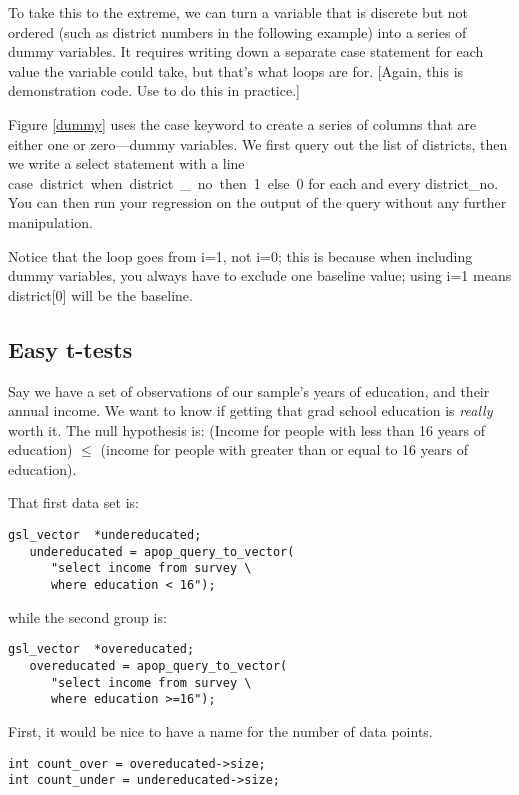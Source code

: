 To take this to the extreme, we can turn a variable that is discrete
but not ordered (such as district numbers in the following example)
into a series of dummy variables. It requires writing down a separate
\si{case} statement for each value the variable could take, but
that's what  loops are for.  [Again, this is demonstration
code. Use  to do this in practice.]


Figure \ref{dummy} uses the \si{case} keyword to create a series of
columns that are either one or zero---dummy variables.  We first query
out the list of districts, then we write a select statement with a line
\si{case district when district\_no then 1 else 0} for each and
every district\_no. You can then run your regression on the output of
the query without any further manipulation.

Notice that the  loop goes from i=1, not i=0; this is because when
including dummy variables, you always have to exclude one baseline
value; using i=1 means district[0] will be the baseline.

\subsection{Easy t-tests}
Say we have a set of observations of our sample's years of education,
and their annual income. We want to know if getting that grad school
education is {\it really} worth it. The null hypothesis is: (Income for
people with less than 16 years of education) $\leq$ (income for people
with greater than or equal to 16 years of education).

That first data set is:
\begin{lstlisting}
gsl_vector	*undereducated;
   undereducated = apop_query_to_vector(
      "select income from survey \
      where education < 16");
\end{lstlisting}
while the second group is:
\begin{lstlisting}
gsl_vector	*overeducated;
   overeducated = apop_query_to_vector(
      "select income from survey \
      where education >=16");
\end{lstlisting}

First, it would be nice to have a name for the number of data points.
\begin{lstlisting}
int count_over = overeducated->size;
int count_under = undereducated->size;
\end{lstlisting}


